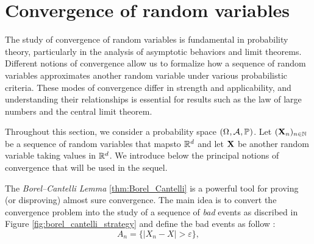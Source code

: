 \documentclass[../Main.tex]{subfiles}
\begin{document}
\section{Convergence of random variables} 

The study of convergence of random variables is fundamental in probability theory, particularly in the analysis of asymptotic behaviors and limit theorems. Different notions of convergence allow us to formalize how a sequence of random variables approximates another random variable under various probabilistic criteria. These modes of convergence differ in strength and applicability, and understanding their relationships is essential for results such as the law of large numbers and the central limit theorem.

Throughout this section, we consider a probability space $(\Omega_{}, \mathcal{A}_{}, \mathbb{P}_{})$. Let $(\mathbf{X}_n)_{n\in\mathbb{N}}$ be a sequence of random variables that mapsto $\mathbb{R}^d$ and let $\mathbf{X}$ be another random variable taking values in $\mathbb{R}^d$. We introduce below the principal notions of convergence that will be used in the sequel.


The \emph{Borel--Cantelli Lemma} \ref{thm:Borel_Cantelli} is a powerful tool for proving (or disproving) almost sure convergence. The main idea is to convert the convergence problem into the study of a sequence of \textit{bad}  events as discribed in Figure \ref{fig:borel_cantelli_strategy} and define the bad events as follow :
\[A_n=\{|X_n-X|>\varepsilon\}, \]




\end{document}
